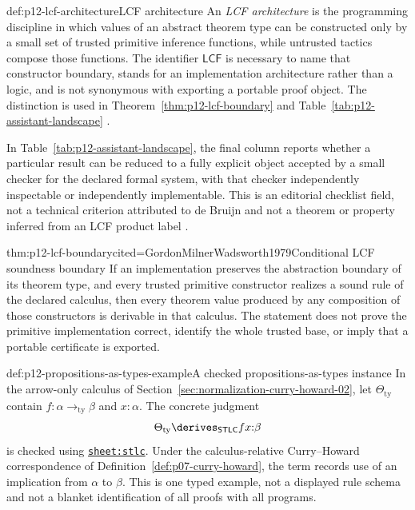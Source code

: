 \begin{hbdefinition}{def:p12-lcf-architecture}{LCF architecture}
An \emph{LCF architecture} is the programming discipline in which values of an
abstract theorem type can be constructed only by a small set of trusted
primitive inference functions, while untrusted tactics compose those
functions.  The identifier \(\mathsf{LCF}\) is necessary to name that
constructor boundary, stands for an implementation architecture rather than a
logic, and is not synonymous with exporting a portable proof object.  The
distinction is used in Theorem~\ref{thm:p12-lcf-boundary} and
Table~\ref{tab:p12-assistant-landscape}
\cite{GordonMilnerWadsworth1979}.
\end{hbdefinition}

In Table~\ref{tab:p12-assistant-landscape}, the final column reports whether a
particular result can be reduced to a fully explicit object accepted by a
small checker for the declared formal system, with that checker independently
inspectable or independently implementable.  This is an editorial checklist
field, not a technical criterion attributed to de Bruijn and not a theorem or
property inferred from an LCF product label \cite{DeBruijn1970,Pollack1998}.

\begin{hbtheorem}{thm:p12-lcf-boundary}{cited=GordonMilnerWadsworth1979}{Conditional LCF soundness boundary}
If an implementation preserves the abstraction boundary of its theorem type,
and every trusted primitive constructor realizes a sound rule of the declared
calculus, then every theorem value produced by any composition of those
constructors is derivable in that calculus.  The statement does not prove the
primitive implementation correct, identify the whole trusted base, or imply
that a portable certificate is exported.
\end{hbtheorem}

\begin{hbexample}{def:p12-propositions-as-types-example}{A checked propositions-as-types instance}
In the arrow-only calculus of Section~\ref{sec:normalization-curry-howard-02}, let
\(\Theta_{\mathrm{ty}}\) contain \(f{:}\alpha\to_{\mathrm{ty}}\beta\) and
\(x{:}\alpha\).  The concrete judgment
\[
 \Theta_{\mathrm{ty}}\derives_{\mathsf{STLC}}fx{:}\beta
\]
is checked using \hyperref[sheet:stlc]{\texttt{sheet:stlc}}.  Under the
calculus-relative Curry--Howard correspondence of
Definition~\ref{def:p07-curry-howard}, the term records use of an implication
from \(\alpha\) to \(\beta\).  This is one typed example, not a displayed rule
schema and not a blanket identification of all proofs with all programs.
\end{hbexample}

